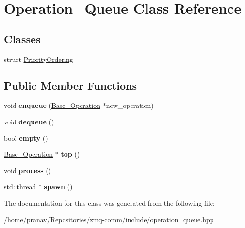 \hypertarget{classOperation__Queue}{}\section{Operation\+\_\+\+Queue Class Reference}
\label{classOperation__Queue}
\subsection*{Classes}
\begin{DoxyCompactItemize}
\item 
struct \hyperlink{structOperation__Queue_1_1PriorityOrdering}{Priority\+Ordering}
\end{DoxyCompactItemize}
\subsection*{Public Member Functions}
\begin{DoxyCompactItemize}
\item 
void {\bfseries enqueue} (\hyperlink{classBase__Operation}{Base\+\_\+\+Operation} $\ast$new\+\_\+operation)\hypertarget{classOperation__Queue_a5d6e152023fb1397c57943a4335a1d36}{}\label{classOperation__Queue_a5d6e152023fb1397c57943a4335a1d36}

\item 
void {\bfseries dequeue} ()\hypertarget{classOperation__Queue_a56dcc8bb196a32a7d4cf6f657bd4508f}{}\label{classOperation__Queue_a56dcc8bb196a32a7d4cf6f657bd4508f}

\item 
bool {\bfseries empty} ()\hypertarget{classOperation__Queue_ade8aa8ed0a275711f1a2b93495713360}{}\label{classOperation__Queue_ade8aa8ed0a275711f1a2b93495713360}

\item 
\hyperlink{classBase__Operation}{Base\+\_\+\+Operation} $\ast$ {\bfseries top} ()\hypertarget{classOperation__Queue_aae5d94270ca2214abef384dced8f76c0}{}\label{classOperation__Queue_aae5d94270ca2214abef384dced8f76c0}

\item 
void {\bfseries process} ()\hypertarget{classOperation__Queue_ae4b30cda2e2b6f2d33c99a60437d4ffe}{}\label{classOperation__Queue_ae4b30cda2e2b6f2d33c99a60437d4ffe}

\item 
std\+::thread $\ast$ {\bfseries spawn} ()\hypertarget{classOperation__Queue_a05f1899538aa7d4b635e00ad9a66d277}{}\label{classOperation__Queue_a05f1899538aa7d4b635e00ad9a66d277}

\end{DoxyCompactItemize}


The documentation for this class was generated from the following file\+:\begin{DoxyCompactItemize}
\item 
/home/pranav/\+Repositories/zmq-\/comm/include/operation\+\_\+queue.\+hpp\end{DoxyCompactItemize}
